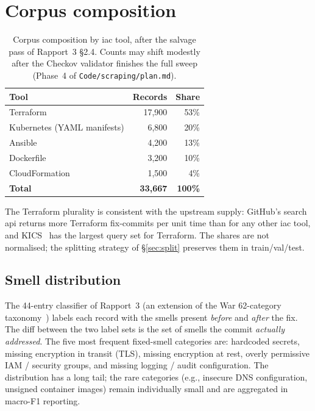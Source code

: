 \documentclass[12pt, a4paper]{report}
\begin{document}
\section{Corpus composition}

\begin{table}[H]
  \centering
  \caption{Corpus composition by \gls{iac} tool, after the salvage pass of
    Rapport~3 \S2.4. Counts may shift modestly after the Checkov
    validator finishes the full sweep (Phase~4 of
    \texttt{Code/scraping/plan.md}).}
  \label{tab:corpus}
  \small
  \begin{tabular}{lrr}
    \toprule
    \textbf{Tool} & \textbf{Records} & \textbf{Share} \\
    \midrule
    Terraform        & ~17{,}900  & 53\%  \\
    Kubernetes (YAML manifests) & ~6{,}800 & 20\% \\
    Ansible          & ~4{,}200   & 13\%  \\
    Dockerfile       & ~3{,}200   & 10\%  \\
    CloudFormation   & ~1{,}500   & 4\%  \\
    \midrule
    \textbf{Total}   & \textbf{33{,}667} & \textbf{100\%} \\
    \bottomrule
  \end{tabular}
\end{table}

The Terraform plurality is consistent with the upstream supply: GitHub's
search \gls{api} returns more Terraform fix-commits per unit time than for
any other \gls{iac} tool, and KICS~\citep{kics2024} has the largest query
set for Terraform. The shares are not normalised; the splitting strategy
of \S\ref{sec:split} preserves them in train/val/test.

\subsection{Smell distribution}

The 44-entry classifier of Rapport~3 (an extension of the War 62-category
taxonomy~\citep{war2025taxonomy}) labels each record with the smells present
\emph{before} and \emph{after} the fix. The diff between the two label sets
is the set of smells the commit \emph{actually addressed}. The five most
frequent fixed-smell categories are: hardcoded secrets, missing encryption
in transit (TLS), missing encryption at rest, overly permissive IAM /
security groups, and missing logging / audit configuration. The
distribution has a long tail; the rare categories (e.g., insecure DNS
configuration, unsigned container images) remain individually small and
are aggregated in macro-F1 reporting.
\end{document}
